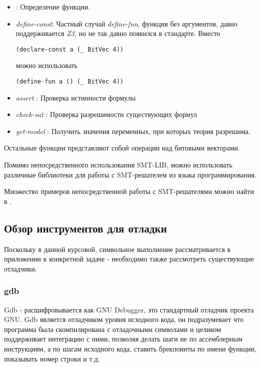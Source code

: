 \begin{itemize}
\item {}: Определение функции.

\item {\em define-const}: Частный случай {\em define-fun}, функция без аргументов, давно поддерживается {\em Z3}, но не так давно появился в стандарте. Вместо
\begin{verbatim}(declare-const a (_ BitVec 4))\end{verbatim}
можно использовать
\begin{verbatim}(define-fun a () (_ BitVec 4))\end{verbatim}

\item {\em assert }: Проверка истинности формулы

\item {\em check-sat }: Проверка разрешимости существующих формул

\item {\em get-model }: Получить значения переменных, при которых теория разрешима.

\end{itemize}

Остальные функции представляют собой операции над битовыми векторами.

\bigskip

Помимо непосредственного использования SMT-LIB, можно использовать различные библиотеки для работы с SMT-решателем из языка программирования.

Множество примеров непосредственной работы с SMT-решателями можно найти в \cite{yusmt}.


\subsection{Обзор инструментов для отладки}

Поскольку в данной курсовой, символьное выполнение рассматривается в приложении к конкретной задаче - необходимо также рассмотреть существующие отладчики.

\subsubsection{gdb}

Gdb \cite{gdb} - расшифровывается как GNU Debugger, это стандартный отладчик проекта GNU.
Gdb является отладчиком уровня исходного кода, он подразумевает что программа была скомпилирована с отладочными символами и целиком поддерживает интеграцию с ними, позволяя делать шаги не по ассемблерным инструкциям, а по шагам исходного кода, ставить брекпоинты по имени функции, показывать номер строки и т.д.

